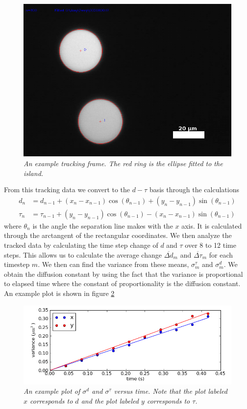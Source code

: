\documentclass[11pt]{article}
\begin{document}
\begin{figure}
\centering
\includegraphics[scale=0.5]{Images/tracked.png}
\caption{\textit{An example tracking frame. The red ring is the ellipse fitted to the island.}}
\label{Tracked}
\end{figure}

From this tracking data we convert to the $d-\tau$ basis through the calculations
\begin{align}
d_n &= d_{n-1} + (x_{n}-x_{n-1})\cos(\theta_{n-1}) + (y_{n}-y_{n-1})\sin(\theta_{n-1})\\
\tau_n &= \tau_{n-1} + (y_{n}-y_{n-1})\cos(\theta_{n-1}) - (x_{n}-x_{n-1})\sin(\theta_{n-1})
\end{align}
where $\theta_n$ is the angle the separation line makes with the $x$ axis. It is calculated through the arctangent of the rectangular coordinates. We then analyze the tracked data by calculating the time step change of $d$ and $\tau$ over 8 to 12 time steps. This allows us to calculate the average change $\overline{\Delta d}_m$ and $\overline{\Delta\tau}_m$ for each timestep $m$. We then can find the variance from these means, $\sigma^{\tau}_m$ and $\sigma^{d}_m$. We obtain the diffusion constant by using the fact that the variance is proportional to elapsed time where the constant of proportionality is the diffusion constant. An example plot is shown in figure \ref{SigmaPlot}

\begin{figure}
\centering
\includegraphics[scale=0.7]{Images/plot-001.png}
\caption{\textit{An example plot of $\sigma^{d}$ and $\sigma^{\tau}$ versus time. Note that the plot labeled $x$ corresponds to $d$ and the plot labeled $y$ corresponds to $\tau$.}}
\label{SigmaPlot}
\end{figure}
\end{document}
